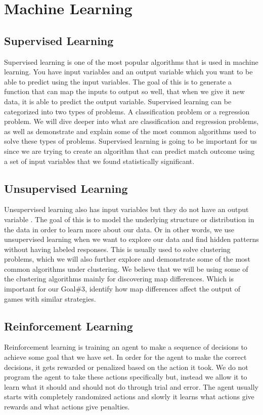 \documentclass[a4paper,12pt]{report}
\begin{document}
\section{Machine Learning}
\subsection{Supervised Learning}

Supervised learning is one of the most popular algorithms that is used in machine learning. You have input variables and an output variable  which you want to be able to predict using the input variables. The goal of this is to generate a function that can map the inputs to output so well, that when we give it new data, it is able to predict the output variable. Supervised learning can be categorized into two types of problems. A classification problem or a regression problem. We will dive deeper into what are classification and regression problems, as well as demonstrate and explain some of the most common algorithms used to solve these types of problems. Supervised learning is going to be important for us since we are trying to create an algorithm that can predict match outcome using a set of input variables that we found statistically significant.

\subsection{Unsupervised Learning}

Unsupervised learning also has input variables  but they do not have an output variable . The goal of this is to model the underlying structure or distribution in the data in order to learn more about our data. Or in other words, we use unsupervised learning when we want to explore our data and find hidden patterns without having labeled responses. This is usually used to solve clustering problems, which we will also further explore and demonstrate some of the most common algorithms under clustering. We believe that we will be using some of the clustering algorithms mainly for discovering map differences. Which is important for our Goal\#3, identify how map differences affect the output of games with similar strategies.

\subsection{Reinforcement Learning}

Reinforcement learning is training an agent to make a sequence of decisions to achieve some goal that we have set. In order for the agent to make the correct decisions, it gets rewarded or penalized based on the action it took. We do not program the agent to take these actions specifically but, instead we allow it to learn what it should and should not do through trial and error. The agent usually starts with completely randomized actions and slowly it learns what actions give rewards and what actions give penalties.
\end{document}
